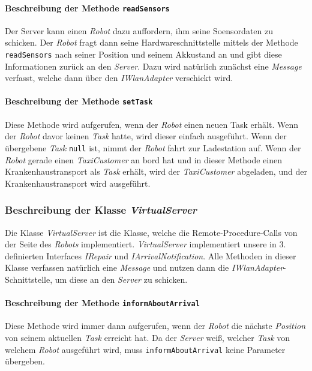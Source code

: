 			\paragraph{Beschreibung der Methode \texttt{readSensors}}
			Der Server kann einen \textit{Robot} dazu auffordern, ihm seine Soensordaten zu schicken. 
			Der \textit{Robot} fragt dann seine Hardwareschnittstelle mittels der Methode \texttt{readSensors} 
			nach seiner Position und seinem Akkustand an und gibt diese Informationen zurück an den \textit{Server}. 
			Dazu wird natürlich zunächst eine \textit{Message} verfasst, welche dann über den \textit{IWlanAdapter} verschickt wird.
			
			\paragraph{Beschreibung der Methode \texttt{setTask}}
			Diese Methode wird aufgerufen, wenn der \textit{Robot} einen neuen Task erhält. Wenn der \textit{Robot} davor keinen \textit{Task} hatte, wird dieser einfach ausgeführt. Wenn der übergebene \textit{Task} \texttt{null} ist, nimmt der \textit{Robot} fahrt zur Ladestation auf. Wenn der \textit{Robot} gerade einen \textit{TaxiCustomer} an bord hat und in dieser Methode einen Krankenhaustransport als \textit{Task} erhält, wird der \textit{TaxiCustomer} abgeladen, und der Krankenhaustransport wird ausgeführt.
			
	\subsubsection{Beschreibung der Klasse \textit{VirtualServer}}
	Die Klasse \textit{VirtualServer} ist die Klasse, welche die Remote-Procedure-Calls von der Seite des \textit{Robots} implementiert. \textit{VirtualServer} implementiert unsere in 3. definierten Interfaces \textit{IRepair} und \textit{IArrivalNotification}. Alle Methoden in dieser Klasse verfassen natürlich eine \textit{Message} und nutzen dann die \textit{IWlanAdapter}-Schnittstelle, um diese an den \textit{Server} zu schicken.
	
			\paragraph{Beschreibung der Methode \texttt{informAboutArrival}}
			Diese Methode wird immer dann aufgerufen, wenn der \textit{Robot} die nächste \textit{Position} von seinem aktuellen \textit{Task} erreicht hat.  Da der \textit{Server} weiß, welcher \textit{Task} von welchem \textit{Robot} ausgeführt wird, muss \texttt{informAboutArrival} keine Parameter übergeben.
	
